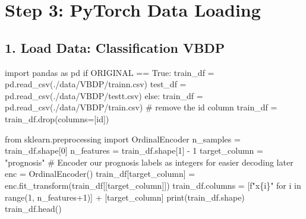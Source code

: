 \documentclass[
  letterpaper,
  DIV=11,
  numbers=noendperiod]{scrreprt}
\newenvironment{Shaded}{\begin{snugshade}}{\end{snugshade}}
\newcommand{\BuiltInTok}[1]{\textcolor[rgb]{0.00,0.23,0.31}{#1}}
\newcommand{\CommentTok}[1]{\textcolor[rgb]{0.37,0.37,0.37}{#1}}
\newcommand{\ControlFlowTok}[1]{\textcolor[rgb]{0.00,0.23,0.31}{#1}}
\newcommand{\DecValTok}[1]{\textcolor[rgb]{0.68,0.00,0.00}{#1}}
\newcommand{\ImportTok}[1]{\textcolor[rgb]{0.00,0.46,0.62}{#1}}
\newcommand{\KeywordTok}[1]{\textcolor[rgb]{0.00,0.23,0.31}{#1}}
\newcommand{\NormalTok}[1]{\textcolor[rgb]{0.00,0.23,0.31}{#1}}
\newcommand{\OperatorTok}[1]{\textcolor[rgb]{0.37,0.37,0.37}{#1}}
\newcommand{\SpecialCharTok}[1]{\textcolor[rgb]{0.37,0.37,0.37}{#1}}
\newcommand{\SpecialStringTok}[1]{\textcolor[rgb]{0.13,0.47,0.30}{#1}}
\newcommand{\StringTok}[1]{\textcolor[rgb]{0.13,0.47,0.30}{#1}}
\newcommand{\VariableTok}[1]{\textcolor[rgb]{0.07,0.07,0.07}{#1}}
\begin{document}
\hypertarget{sec-data-loading-17}{%
\section{Step 3: PyTorch Data Loading}\label{sec-data-loading-17}}

\hypertarget{load-data-classification-vbdp-1}{%
\subsection{1. Load Data: Classification
VBDP}\label{load-data-classification-vbdp-1}}

\begin{Shaded}
\begin{Highlighting}[]
\ImportTok{import}\NormalTok{ pandas }\ImportTok{as}\NormalTok{ pd}
\ControlFlowTok{if}\NormalTok{ ORIGINAL }\OperatorTok{==} \VariableTok{True}\NormalTok{:}
\NormalTok{    train\_df }\OperatorTok{=}\NormalTok{ pd.read\_csv(}\StringTok{\textquotesingle{}./data/VBDP/trainn.csv\textquotesingle{}}\NormalTok{)}
\NormalTok{    test\_df }\OperatorTok{=}\NormalTok{ pd.read\_csv(}\StringTok{\textquotesingle{}./data/VBDP/testt.csv\textquotesingle{}}\NormalTok{)}
\ControlFlowTok{else}\NormalTok{:}
\NormalTok{    train\_df }\OperatorTok{=}\NormalTok{ pd.read\_csv(}\StringTok{\textquotesingle{}./data/VBDP/train.csv\textquotesingle{}}\NormalTok{)}
    \CommentTok{\# remove the id column}
\NormalTok{    train\_df }\OperatorTok{=}\NormalTok{ train\_df.drop(columns}\OperatorTok{=}\NormalTok{[}\StringTok{\textquotesingle{}id\textquotesingle{}}\NormalTok{])}
\end{Highlighting}
\end{Shaded}

\begin{Shaded}
\begin{Highlighting}[]
\ImportTok{from}\NormalTok{ sklearn.preprocessing }\ImportTok{import}\NormalTok{ OrdinalEncoder}
\NormalTok{n\_samples }\OperatorTok{=}\NormalTok{ train\_df.shape[}\DecValTok{0}\NormalTok{]}
\NormalTok{n\_features }\OperatorTok{=}\NormalTok{ train\_df.shape[}\DecValTok{1}\NormalTok{] }\OperatorTok{{-}} \DecValTok{1}
\NormalTok{target\_column }\OperatorTok{=} \StringTok{"prognosis"}
\CommentTok{\# Encoder our prognosis labels as integers for easier decoding later}
\NormalTok{enc }\OperatorTok{=}\NormalTok{ OrdinalEncoder()}
\NormalTok{train\_df[target\_column] }\OperatorTok{=}\NormalTok{ enc.fit\_transform(train\_df[[target\_column]])}
\NormalTok{train\_df.columns }\OperatorTok{=}\NormalTok{ [}\SpecialStringTok{f"x}\SpecialCharTok{\{}\NormalTok{i}\SpecialCharTok{\}}\SpecialStringTok{"} \ControlFlowTok{for}\NormalTok{ i }\KeywordTok{in} \BuiltInTok{range}\NormalTok{(}\DecValTok{1}\NormalTok{, n\_features}\OperatorTok{+}\DecValTok{1}\NormalTok{)] }\OperatorTok{+}\NormalTok{ [target\_column]}
\BuiltInTok{print}\NormalTok{(train\_df.shape)}
\NormalTok{train\_df.head()}
\end{Highlighting}
\end{Shaded}
\end{document}
